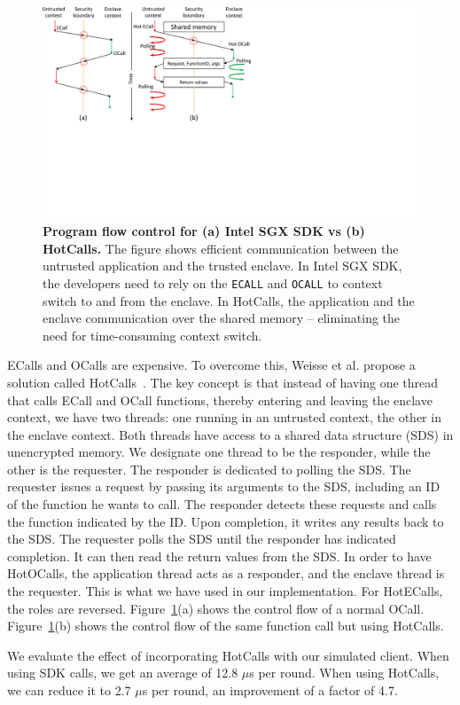 \begin{figure}[t]
  \centering
    \includegraphics[trim={0 8cm 15cm 0}, clip, width=\linewidth]{chapters/ProximiTEE/images_new/hotcalls.pdf}
    \caption[Program flow control for Intel SGX SDK vs HotCalls]{\textbf{Program flow control for (a) Intel SGX SDK vs (b) HotCalls.} The figure shows efficient communication between the untrusted application and the trusted enclave. In Intel SGX SDK, the developers need to rely on the \texttt{ECALL} and \texttt{OCALL} to context switch to and from the enclave. In HotCalls, the application and the enclave communication over the shared memory -- eliminating the need for time-consuming context switch.}
    \label{fig:hotcalls}
\end{figure}

 ECalls and OCalls are expensive. To overcome this, Weisse et al. propose a solution called HotCalls~\cite{weisse2017regaining}. The key concept is that instead of having one thread that calls ECall and OCall functions, thereby entering and leaving the enclave context, we have two threads: one running in an untrusted context, the other in the enclave context. Both threads have access to a shared data structure (SDS) in unencrypted memory. We designate one thread to be the responder, while the other is the requester. The responder is dedicated to polling the SDS. The requester issues a request by passing its arguments to the SDS, including an ID of the function he wants to call. The responder detects these requests and calls the function indicated by the ID. Upon completion, it writes any results back to the SDS. The requester polls the SDS until the responder has indicated completion. It can then read the return values from the SDS. In order to have HotOCalls, the application thread acts as a responder, and the enclave thread is the requester. This is what we have used in our implementation. For HotECalls, the roles are reversed. Figure~\ref{fig:hotcalls}(a) shows the control flow of a normal OCall. Figure~\ref{fig:hotcalls}(b) shows the control flow of the same function call but using HotCalls.

We evaluate the effect of incorporating HotCalls with our simulated client. When using SDK calls, we get an average of 12.8 $\mu$s per round. When using HotCalls, we can reduce it to 2.7 $\mu$s per round, an improvement of a factor of 4.7.